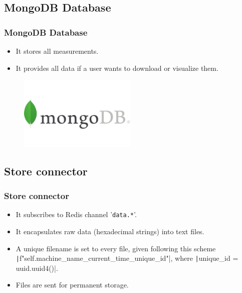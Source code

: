 \subsection{MongoDB Database}
\begin{frame}
	\frametitle{MongoDB Database}
	
	\begin{itemize}
		\item It stores all measurements.
		\item It provides all data if a user wants to download or visualize them.
	\end{itemize}
	
	\begin{figure}[h]
		\centering
		\includegraphics[width=0.5\textwidth]{./img/MongoDB-Logo.png}
	\end{figure}
\end{frame}


\subsection{Store connector}
\begin{frame}[containsverbatim]
	\frametitle{Store connector}
	
	\begin{itemize}
		\item It subscribes to Redis channel '\verb|data.*|'.
		\item It encapsulates raw data (hexadecimal strings) into text files.
		\item A unique filename is set to every file, given following this scheme
			\texttt|f"{self.machine_name}_{current_time}_{unique_id}"|,
			where \texttt|unique_id = uuid.uuid4()|.
		\item Files are sent for permanent storage.
	\end{itemize}
	
\end{frame}

